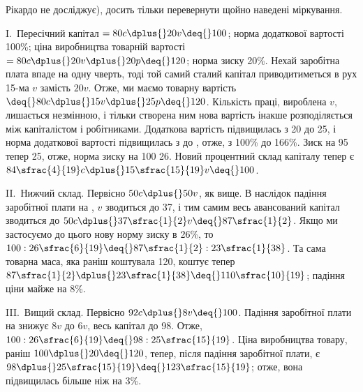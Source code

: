\parcont{}  %
Рікардо не досліджує), досить тільки перевернути щойно наведені
міркування.

I.~Пересічний капітал $= 80 c \dplus{} 20 v \deq{} 100$; норма додаткової
вартості \deq{} 100\%; ціна виробництва \deq{} товарній вартості $= 80 c \dplus{}
20 v \dplus{} 20 p \deq{} 120$; норма зиску \deq{} 20\%. Нехай заробітна плата
впаде на одну чверть, тоді той самий сталий капітал приводитиметься
в рух 15-ма $v$ замість $20 v$. Отже, ми маємо товарну
вартість $ \deq{} 80 c \dplus{} 15 v \dplus{} 25 p \deq{} 120$. Кількість праці, вироблена $v$,
лишається  незмінною, і тільки створена ним нова вартість інакше
розподіляється між капіталістом і робітниками. Додаткова вартість
підвищилась з 20 до 25, і норма додаткової вартості
підвищилась з  до , отже, з 100\% до 166\%.
Зиск на 95 тепер \deq{} 25, отже, норма зиску на 100 \deq{} 26. Новий
процентний склад капіталу тепер є $84\sfrac{4}{19}c \dplus{} 15\sfrac{15}{19}v \deq{} 100$.

II.~Нижчий склад. Первісно $50 c \dplus{} 50 v$, як вище. В наслідок
падіння заробітної плати на , $v$ зводиться до 37, і тим самим
весь авансований капітал зводиться до $50 c \dplus{} 37\sfrac{1}{2}v \deq{} 87\sfrac{1}{2}$. Якщо
ми застосуємо до цього нову норму зиску в 26\%, то
$100 : 26\sfrac{6}{19} \deq{} 87\sfrac{1}{2} : 23\sfrac{1}{38}$. Та сама товарна маса,
яка раніш коштувала 120, коштує
тепер $87\sfrac{1}{2} \dplus{} 23\sfrac{1}{38} \deq{} 110\sfrac{10}{19}$; падіння ціни
майже на 8\%.

\enlargethispage{\baselineskip}
III.~Вищий склад. Первісно $92 c \dplus{} 8 v \deq{} 100$. Падіння заробітної
плати на  знижує $8 v$ до $6 v$, весь капітал до 98. Отже,
$100 : 26\sfrac{6}{19} \deq{} 98 : 25\sfrac{15}{19}$. Ціна виробництва товару,
раніш $100 \dplus{} 20 \deq{} 120$, тепер, після падіння заробітної плати, є
$98 \dplus{} 25\sfrac{15}{19} \deq{} 123\sfrac{15}{19}$;
отже, вона підвищилась більше ніж на 3\%.

